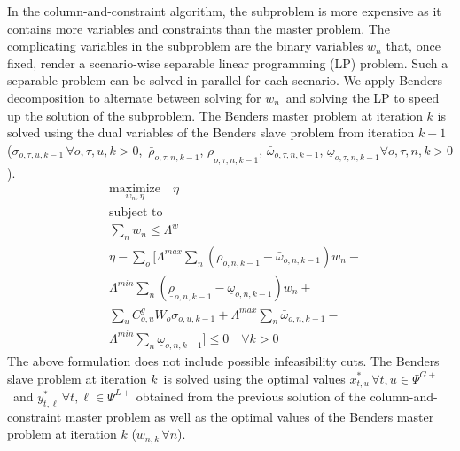 \documentclass[final]{IEEEtran}
\begin{document}
In the column-and-constraint algorithm, the subproblem is more expensive as it contains more variables and constraints than the master problem. The complicating variables in the subproblem are the binary variables $w_n$ that, once fixed, render a scenario-wise separable linear programming (LP) problem. Such a separable problem can be solved in parallel for each scenario. We apply Benders decomposition to alternate between solving for $w_n$ and solving the LP to speed up the solution of the subproblem. The Benders master problem at iteration $k$ is solved using the dual variables of the Benders slave problem from iteration $k-1$ ($\sigma_{o, \tau, u, k-1} \, \forall o, \tau, u, k > 0$, $\, \bar{\rho}_{o, \tau, n, k-1}$, $\underline{\rho}_{o, \tau, n, k-1}$, $\bar{\omega}_{o, \tau, n, k-1}$, $\underline{\omega}_{o, \tau, n, k-1} \forall o, \tau, n, k > 0$).
\begin{align}
&\label{benders_master_obj} \underset{w_n, \eta} {\text{maximize}} \quad \eta \\
&\text{subject to} \nonumber \\
&\sum\limits_n w_n \leq \Lambda^w \\
&\eta - \sum\limits_o \Big[ \Lambda^{max} \sum\limits_n (\bar{\rho}_{o, n, k-1} - \bar{\omega}_{o, n, k-1}) w_n - \nonumber \\
&\Lambda^{min} \sum\limits_n (\underline{\rho}_{o, n, k-1} - \underline{\omega}_{o, n, k-1})  w_n + \nonumber \\
&\sum\limits_u C^g_{o,u} W_o \sigma_{o, u, k-1} + \Lambda^{max} \sum\limits_n \bar{\omega}_{o, n, k-1} - \nonumber \\
&\label{benders_master_last}\Lambda^{min} \sum\limits_n \underline{\omega}_{o, n, k-1} \Big] \leq 0 \quad \forall k > 0
\end{align}
The above formulation does not include possible infeasibility cuts. The Benders slave problem at iteration $k$ is solved using the optimal values $x_{t, u}^* \, \forall t, u \in \Psi^{G+}$ and $y_{t, \ell}^* \, \forall t, \ell \in \Psi^{L+}$ obtained from the previous solution of the column-and-constraint master problem as well as the optimal values of the Benders master problem at iteration $k$ ($w_{n, k} \, \forall n$).
\end{document}
